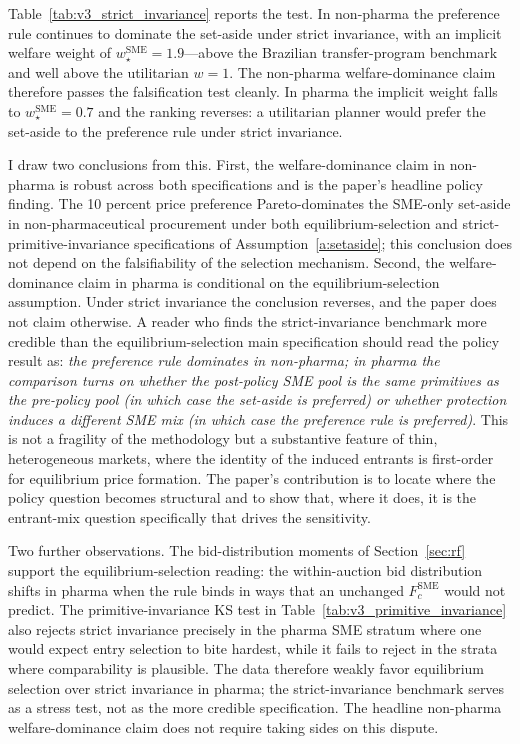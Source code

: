 Table~\ref{tab:v3_strict_invariance} reports the test. In non-pharma the preference rule continues to dominate the set-aside under strict invariance, with an implicit welfare weight of $w_\star^{\text{SME}} = 1.9$---above the Brazilian transfer-program benchmark and well above the utilitarian $w = 1$. The non-pharma welfare-dominance claim therefore passes the falsification test cleanly. In pharma the implicit weight falls to $w_\star^{\text{SME}} = 0.7$ and the ranking reverses: a utilitarian planner would prefer the set-aside to the preference rule under strict invariance.

I draw two conclusions from this. First, the welfare-dominance claim in non-pharma is robust across both specifications and is the paper's headline policy finding. The 10 percent price preference Pareto-dominates the SME-only set-aside in non-pharmaceutical procurement under both equilibrium-selection and strict-primitive-invariance specifications of Assumption~\ref{a:setaside}; this conclusion does not depend on the falsifiability of the selection mechanism. Second, the welfare-dominance claim in pharma is conditional on the equilibrium-selection assumption. Under strict invariance the conclusion reverses, and the paper does not claim otherwise. A reader who finds the strict-invariance benchmark more credible than the equilibrium-selection main specification should read the policy result as: \emph{the preference rule dominates in non-pharma; in pharma the comparison turns on whether the post-policy SME pool is the same primitives as the pre-policy pool (in which case the set-aside is preferred) or whether protection induces a different SME mix (in which case the preference rule is preferred)}. This is not a fragility of the methodology but a substantive feature of thin, heterogeneous markets, where the identity of the induced entrants is first-order for equilibrium price formation. The paper's contribution is to locate where the policy question becomes structural and to show that, where it does, it is the entrant-mix question specifically that drives the sensitivity.

Two further observations. The bid-distribution moments of Section~\ref{sec:rf} support the equilibrium-selection reading: the within-auction bid distribution shifts in pharma when the rule binds in ways that an unchanged $F_c^{\text{SME}}$ would not predict. The primitive-invariance KS test in Table~\ref{tab:v3_primitive_invariance} also rejects strict invariance precisely in the pharma SME stratum where one would expect entry selection to bite hardest, while it fails to reject in the strata where comparability is plausible. The data therefore weakly favor equilibrium selection over strict invariance in pharma; the strict-invariance benchmark serves as a stress test, not as the more credible specification. The headline non-pharma welfare-dominance claim does not require taking sides on this dispute.

